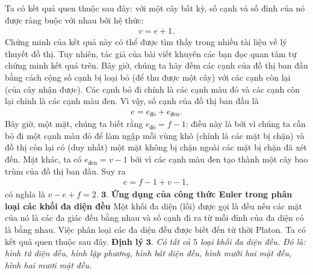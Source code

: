 \begin{multicols}{2}
\begin{figure}[H]
		\vspace*{-10pt}
	\end{figure}
	Ta có kết quả quen thuộc sau đây: với một cây bất kỳ, số cạnh và số đỉnh của nó được ràng buộc với nhau bởi hệ thức: 
	\begin{align*}
		\boxed{v = e + 1.}
	\end{align*}
	Chứng minh của kết quả này có thể được tìm thấy trong nhiều tài liệu về lý thuyết đồ thị. Tuy nhiên, tác giả của bài viết khuyên các bạn đọc quan tâm tự chứng minh kết quả trên.
	\vskip 0.1cm
	Bây giờ, chúng ta hãy đếm các cạnh của đồ thị ban đầu bằng cách cộng số cạnh bị loại bỏ (để thu được một cây) với các cạnh còn lại (của cây nhận được).  Các cạnh bỏ đi chính là các cạnh màu đỏ và các cạnh còn lại chính là các cạnh màu đen. Vì vậy, số cạnh của đồ thị ban đầu là
	\begin{align*}
		e = e_{\textrm{đỏ}} + e_{\textrm{đen}}.
	\end{align*}
	Bây giờ, một mặt, chúng ta biết rằng $e_{\textrm{đỏ}}=f-1$: điều này là bởi vì chúng ta cần bỏ đi một cạnh màu đỏ để làm ngập mỗi vùng khô (chính là các mặt bị chặn) và đồ thị còn lại có (duy nhất) một mặt không bị chặn ngoài các mặt bị chặn đã xét đến. Mặt khác, ta có $e_{\textrm{đen}}=v-1$ bởi vì các cạnh màu đen tạo thành một cây bao trùm của đồ thị ban đầu. Suy ra
	\begin{align*}
		e = f-1 + v-1,
	\end{align*}
	có nghĩa là $v-e+f=2$.
	\vskip 0.1cm
	$\pmb{3.}$ \textbf{\color{hoccungpi}Ứng dụng của công thức Euler trong phân loại các khối đa diện đều}
	\vskip 0.1cm
	Một khối đa diện (lồi) được gọi là đều nếu các mặt của nó là các đa giác đều bằng nhau và số cạnh đi ra từ mỗi đỉnh của đa diện có là bằng nhau. Việc phân loại các đa diện đều được biết đến từ thời Platon. Ta có kết quả quen thuộc sau đây.
	\vskip 0.1cm
	\textbf{\color{hoccungpi}Định lý} $\pmb{3.}$ \textit{Có tất cả $5$ loại khối đa diện đều. Đó là: hình tứ diện đều, hình lập phương, hình bát diện đều, hình mười hai mặt đều, hình hai mươi mặt đều.}
	\begin{figure}[H]
		\centering
		\vspace*{-5pt}
		\captionsetup{labelformat= empty, justification=centering}

\end{figure}
\end{multicols}
